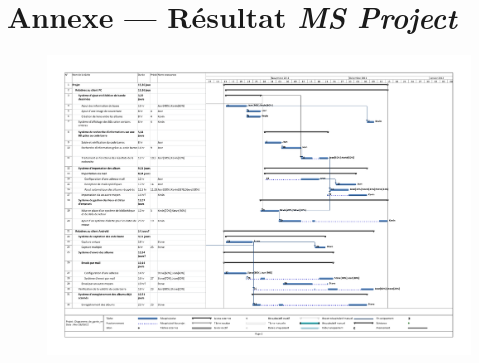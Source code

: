 \documentclass[etudiants]{support-iutrs}
\begin{document}
\newpage{}
\section{Annexe — Résultat \emph{MS Project}}

\begin{figure}[h!]
 \centering
\includegraphics[angle=90, width=16cm]{diagramme_gante.pdf}
\end{figure} 

%
%
\end{document}
